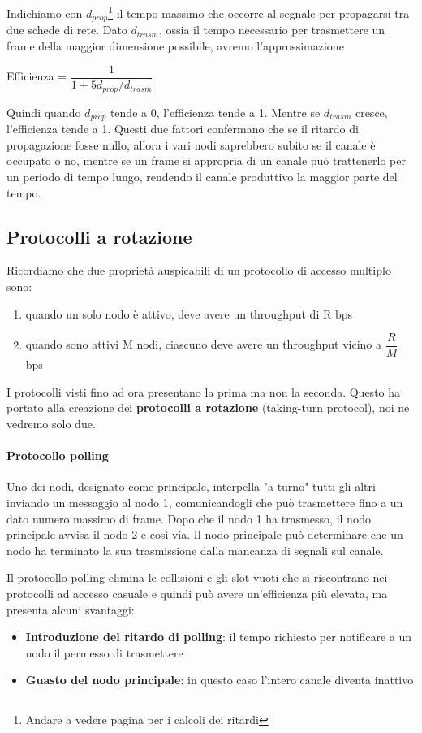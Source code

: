 \documentclass[11pt,a4paper]{book}
\begin{document}
Indichiamo con $d_{prop}$\footnote{Andare a vedere pagina \pageref{par: ritardi} per i calcoli dei ritardi} il tempo massimo che occorre al segnale per propagarsi tra due schede di rete. Dato $d_{trasm}$, ossia il tempo necessario per trasmettere un frame della maggior dimensione possibile, avremo l'approssimazione
\begin{center}
	Efficienza = $\dfrac{1}{1 + 5d_{prop}/d_{trasm}}$
\end{center}
Quindi quando $d_{prop}$ tende a 0, l'efficienza tende a 1. Mentre se $d_{trasm}$ cresce, l'efficienza tende a 1. Questi due fattori confermano che se il ritardo di propagazione fosse nullo, allora i vari nodi saprebbero subito se il canale è occupato o no, mentre se un frame si appropria di un canale può trattenerlo per un periodo di tempo lungo, rendendo il canale produttivo la maggior parte del tempo.

\subsection{Protocolli a rotazione}
Ricordiamo che due proprietà auspicabili di un protocollo di accesso multiplo sono:
\begin{enumerate}
	\item quando un solo nodo  è attivo, deve avere un throughput di R bps
	\item quando sono attivi M nodi, ciascuno deve avere un throughput vicino a $\dfrac{R}{M}$ bps
\end{enumerate}
I protocolli visti fino ad ora presentano la prima ma non la seconda. Questo ha portato alla creazione dei \textbf{protocolli a rotazione} (taking-turn protocol), noi ne vedremo solo due.
\paragraph{Protocollo polling}
Uno dei nodi, designato come principale, interpella "a turno" tutti gli altri inviando un messaggio al nodo 1, comunicandogli che può trasmettere fino a un dato numero massimo di frame. Dopo che il nodo 1 ha trasmesso, il nodo principale avvisa il nodo 2 e così via. Il nodo principale può determinare che un nodo ha terminato la sua trasmissione dalla mancanza di segnali sul canale.

Il protocollo polling elimina le collisioni e gli slot vuoti che si riscontrano nei protocolli ad accesso casuale e quindi può avere un'efficienza più elevata, ma presenta alcuni svantaggi:
\begin{itemize}
	\item \textbf{Introduzione del ritardo di polling}: il tempo richiesto per notificare a un nodo il permesso di trasmettere
	\item \textbf{Guasto del nodo principale}: in questo caso l'intero canale diventa inattivo
\end{itemize}
\end{document}
